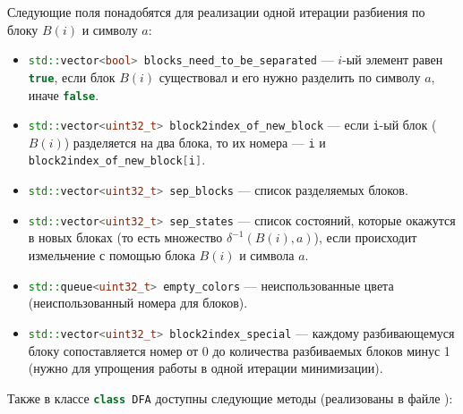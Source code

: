 \documentclass{article}
\begin{document}
Следующие поля понадобятся для реализации одной итерации разбиения по блоку $B(i)$ и символу $a$:
\begin{itemize}
  \item \lstinline[language=C++]!std::vector<bool> blocks_need_to_be_separated! --- $i$-ый элемент равен \lstinline[language=C++]!true!, если блок $B(i)$ существовал и его нужно разделить по символу $a$, иначе \lstinline[language=C++]!false!.
  \item \lstinline[language=C++]!std::vector<uint32_t> block2index_of_new_block! --- если \lstinline[language=C++]!i!-ый блок ($B(i)$) разделяется на два блока, то их номера --- \lstinline[language=C++]!i! и \lstinline[language=C++]!block2index_of_new_block[i]!.
  \item \lstinline[language=C++]!std::vector<uint32_t> sep_blocks! --- список разделяемых блоков.
  \item \lstinline[language=C++]!std::vector<uint32_t> sep_states! --- список состояний, которые окажутся в новых блоках (то есть множество $\delta^{-1}(B(i), a)$), если происходит измельчение с помощью блока $B(i)$ и символа $a$.
  \item \lstinline[language=C++]!std::queue<uint32_t> empty_colors! --- неиспользованные цвета (неиспользованный номера для блоков).
  \item \lstinline[language=C++]!std::vector<uint32_t> block2index_special! --- каждому разбивающемуся блоку сопоставляется номер от 0 до количества разбиваемых блоков минус 1 (нужно для упрощения работы в одной итерации минимизации).
\end{itemize}
Также в классе \lstinline[language=C++]!class DFA! доступны следующие методы (реализованы в файле ):
\end{document}
